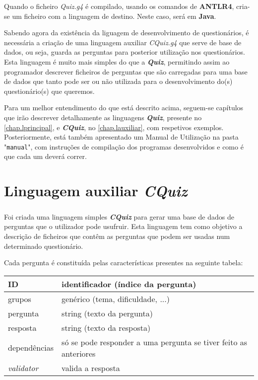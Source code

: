 \documentclass{report}
\begin{document}
Quando o ficheiro \textit{Quiz.g4} é compilado, usando os comandos de \textbf{ANTLR4}, cria-se um ficheiro com a linguagem de destino. Neste caso, será em \textbf{Java}.

Sabendo agora da existência da liguagem de desenvolvimento de questionários, é necessária a criação de uma linguagem auxiliar \textit{CQuiz.g4} que serve de base de dados, ou seja, guarda as perguntas para posterior utilização nos questionários. Esta linguagem é muito mais simples do que a \textbf{\textit{Quiz}}, permitindo assim ao programador descrever ficheiros de perguntas que são carregadas para uma base de dados que tanto pode ser ou não utilizada para o desenvolvimento do(s) questionário(s) que queremos.

Para um melhor entendimento do que está descrito acima, seguem-se capítulos que irão descrever detalhamente as linguagens \textbf{\textit{Quiz}}, presente no \autoref{chap.lprincipal}, e \textbf{\textit{CQuiz}}, no \autoref{chap.lauxiliar}, com respetivos exemplos. Posteriormente, está também apresentado um Manual de Utilização na pasta "\texttt{manual}", com instruções de compilação dos programas desenvolvidos e como é que cada um deverá correr.





\chapter{Linguagem auxiliar \textit{CQuiz}}
\label{chap.lauxiliar}

\paragraph{}

Foi criada uma linguagem simples \textbf{\textit{CQuiz}} para gerar uma base de dados de perguntas que o utilizador pode usufruir. Esta linguagem tem como objetivo a descrição de ficheiros que contêm as perguntas que podem ser usadas num determinado questionário.

Cada pergunta é constituída pelas características presentes na seguinte tabela:

\begin{center}
\begin{tabular}{| l | l |}
	\hline
	ID 	    			& identificador (índice da pergunta) \\
	\hline
	grupos				& genérico (tema, dificuldade, ...) \\
	\hline
	pergunta			& string (texto da pergunta) \\
	\hline
	resposta			& string (texto da resposta) \\	
	\hline
	dependências		& só se pode responder a uma pergunta se tiver feito as anteriores \\
	\hline
	\textit{validator}	& valida a resposta \\
	\hline
\end{tabular}
\end{center}
\end{document}

